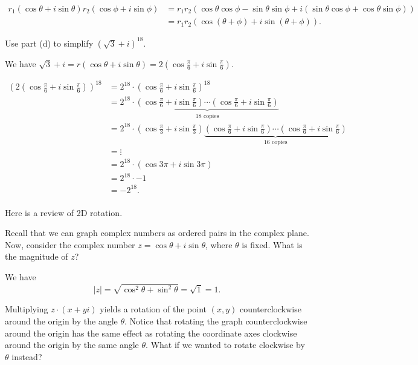 \documentclass[../gatm_answers.tex]{subfiles}
\begin{document}
\begin{align*}
r_1(\cos\theta + i\sin\theta)r_2(\cos\phi + i\sin\phi) &= r_1r_2(\cos\theta\cos\phi - \sin\theta\sin\phi + i(\sin\theta\cos\phi + \cos\theta\sin\phi)) \\
&= r_1r_2(\cos(\theta+\phi) + i \sin(\theta+\phi)).
\end{align*}

\begin{inner_problem}
\item Use part (d) to simplify $(\sqrt{3}+i)^{18}$.
\end{inner_problem}

We have $\sqrt{3}+i=r(\cos\theta + i\sin\theta) = 2\left(\cos\frac{\pi}{6} + i\sin\frac{\pi}{6}\right)$.

\begin{align*}
(2\left(\cos\frac{\pi}{6} + i\sin\frac{\pi}{6}\right))^{18} &= 2^{18} \cdot \left(\cos\frac{\pi}{6} + i\sin\frac{\pi}{6}\right)^{18} \\
&= 2^{18}\cdot \underbrace{\left(\cos\frac{\pi}{6} + i\sin\frac{\pi}{6}\right)\cdots \left(\cos\frac{\pi}{6} + i\sin\frac{\pi}{6}\right)}_{18\text{ copies}} \\
&= 2^{18}\cdot \left(\cos\frac{\pi}{3} + i\sin\frac{\pi}{3}\right) \underbrace{\left(\cos\frac{\pi}{6} + i\sin\frac{\pi}{6}\right)\cdots \left(\cos\frac{\pi}{6} + i\sin\frac{\pi}{6}\right)}_{16\text{ copies}} \\
&= \vdots \\
&= 2^{18}\cdot \left(\cos 3\pi + i\sin 3\pi\right) \\
&= 2^{18}\cdot -1 \\
&= -2^{18}. \\
\end{align*}

\begin{outer_problem}
\item Here is a review of 2D rotation.
\end{outer_problem}

\begin{inner_problem}[start=1]
\item Recall that we can graph complex numbers as ordered pairs in the complex plane. Now, consider the complex number $z=\cos \theta + i\sin\theta$, where $\theta$ is fixed. What is the magnitude of $z$?
\end{inner_problem}

We have $$|z|=\sqrt{\cos^2\theta + \sin^2\theta}=\sqrt{1}=1.$$

\begin{inner_problem}
\item Multiplying $z\cdot(x+yi)$ yields a rotation of the point $(x,y)$ counterclockwise around the origin by the angle $\theta$. Notice that rotating the graph counterclockwise around the origin has the same effect as rotating the coordinate axes clockwise around the origin by the same angle $\theta$. What if we wanted to rotate clockwise by $\theta$ instead?
\end{inner_problem}
\end{document}
